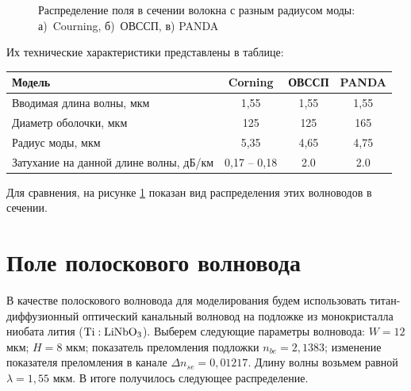 \begin{figure}[h!]
	\begin{minipage}[h]{0.49\linewidth}
	\end{minipage}
	\hfill
	\begin{minipage}[h]{0.49\linewidth}
	\end{minipage}
	\vfill
	\begin{minipage}[h]{0.49\linewidth}
	\end{minipage}
	\hfill
	\begin{minipage}[h]{0.49\linewidth}
	\end{minipage}
	\caption{Распределение поля в сечении волокна с разным радиусом моды: а)~Courning, б)~ОВССП, в) PANDA}
	\label{diameter}
\end{figure}

Их технические характеристики представлены в таблице:
\begin{center}
\begin{tabular}{|p{6cm}|c|c|c|}
\hline
Модель & Corning & ОВССП & PANDA \\
\hline
Вводимая длина волны, мкм & 1,55 & 1,55 & 1,55 \\
\hline
Диаметр оболочки, мкм & 125 & 125 & 165 \\
\hline
Радиус моды, мкм & 5,35 & 4,65 & 4,75 \\
\hline
Затухание на данной длине волны, дБ/км & 0,17 – 0,18 & 2.0 & 2.0 \\
\hline
\end{tabular}
\end{center}

Для сравнения, на рисунке \ref{diameter} показан вид распределения этих волноводов в сечении.

\section{Поле полоскового волновода}
\label{strip_field}
В качестве полоскового волновода для моделирования будем использовать титан-диффузионный оптический канальный волновод на подложке из монокристалла ниобата лития ($\rm Ti:LiNbO_3$)\cite{vlada}. Выберем  следующие параметры волновода: $W=12$ мкм; $H=8$ мкм; показатель преломления подложки $n_{be}=2,1383$; изменение показателя преломления в канале $\Delta n_{se}=0,01217$. Длину волны возьмем равной $\lambda = 1,55$ мкм. В итоге получилось следующее распределение.

